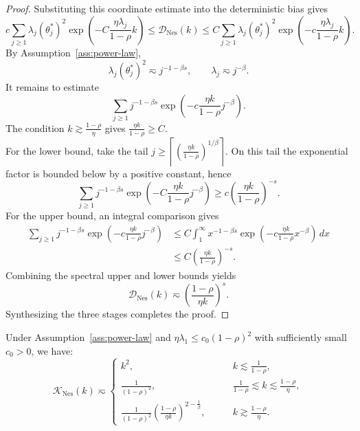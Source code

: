 \begin{proof}
Substituting this coordinate estimate into the deterministic bias gives
\[
    c\sum_{j\ge1}\lambda_j(\theta_j^*)^2
    \exp\left(-C\frac{\eta\lambda_j}{1-\rho}k\right)
    \le
    \mathcal D_{\mathrm{Nes}}(k)
    \le
    C\sum_{j\ge1}\lambda_j(\theta_j^*)^2
    \exp\left(-c\frac{\eta\lambda_j}{1-\rho}k\right).
\]
By Assumption~\ref{ass:power-law},
\[
    \lambda_j(\theta_j^*)^2\eqsim j^{-1-\beta s},
    \qquad
    \lambda_j\eqsim j^{-\beta}.
\]
It remains to estimate
\[
    \sum_{j\ge1}j^{-1-\beta s}
    \exp\left(-c\frac{\eta k}{1-\rho}j^{-\beta}\right).
\]
The condition $k \gtrsim \frac{1-\rho}{\eta}$ gives \(\frac{\eta k}{1-\rho}\ge C\). \\
For the lower bound, take the tail
$j\ge
    \left\lceil
    \left(\frac{\eta k}{1-\rho}\right)^{1/\beta}
    \right\rceil.$
On this tail the exponential factor is bounded below by a positive constant, hence
\[
    \sum_{j\ge1}j^{-1-\beta s}
    \exp\left(-C\frac{\eta k}{1-\rho}j^{-\beta}\right)
    \ge
    c\left(\frac{\eta k}{1-\rho}\right)^{-s}.
\]
For the upper bound, an integral comparison gives
\[
\begin{aligned}
    \sum_{j\ge1}j^{-1-\beta s}
    \exp\left(-c\frac{\eta k}{1-\rho}j^{-\beta}\right)
    &\le
    C\int_1^\infty x^{-1-\beta s}
    \exp\left(-c\frac{\eta k}{1-\rho}x^{-\beta}\right)\,dx \\
    &\le
    C\left(\frac{\eta k}{1-\rho}\right)^{-s}.
\end{aligned}
\]
Combining the spectral upper and lower bounds yields
\[
    \mathcal D_{\mathrm{Nes}}(k)
    \eqsim
    \left(\frac{1-\rho}{\eta k}\right)^s.
\]
Synthesizing the three stages completes the proof.
\end{proof}

\begin{lemma}
\label{lem:nes_kernel0}
Under Assumption~\ref{ass:power-law} and $\eta\lambda_1\le c_0(1-\rho)^2$ with sufficiently small \(c_0>0\), we have:
\begin{equation*}
    \mathcal{K}_{\mathrm{Nes}}(k)
    \eqsim \begin{cases}
    k^2, &\qquad k\lesssim \frac{1}{1-\rho},\\
    \frac{1}{(1-\rho)^2}, &\qquad \frac{1}{1-\rho}\lesssim k \lesssim \frac{1-\rho}{\eta},\\
    \frac{1}{(1-\rho)^2}
    \left(\frac{1-\rho}{\eta k}\right)^{2-\frac1\beta}, &\qquad k \gtrsim \frac{1-\rho}{\eta}.
\end{cases}
\end{equation*}
\end{lemma}

